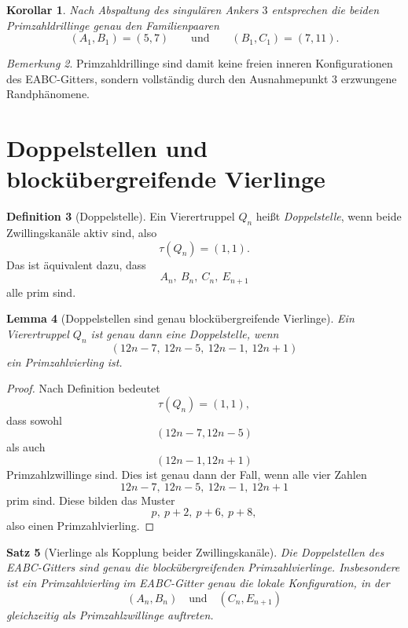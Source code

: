 \documentclass[11pt,a4paper]{article}
\newtheorem{satz}{Satz}
\newtheorem{lemma}[satz]{Lemma}
\newtheorem{korollar}[satz]{Korollar}
\theoremstyle{definition}
\newtheorem{definition}[satz]{Definition}
\theoremstyle{remark}
\newtheorem{bemerkung}[satz]{Bemerkung}
\begin{document}
	\begin{korollar}
		Nach Abspaltung des singulären Ankers \(3\) entsprechen die beiden Primzahldrillinge genau den
		Familienpaaren
		\[
		(A_1,B_1)=(5,7)
		\qquad\text{und}\qquad
		(B_1,C_1)=(7,11).
		\]
	\end{korollar}
	
	\begin{bemerkung}
		Primzahldrillinge sind damit keine freien inneren Konfigurationen des EABC-Gitters, sondern
		vollständig durch den Ausnahmepunkt \(3\) erzwungene Randphänomene.
	\end{bemerkung}
	
	\section{Doppelstellen und blockübergreifende Vierlinge}
	
	\begin{definition}[Doppelstelle]
		Ein Vierertruppel \(Q_n\) heißt \emph{Doppelstelle}, wenn beide Zwillingskanäle aktiv sind, also
		\[
		\tau(Q_n)=(1,1).
		\]
		Das ist äquivalent dazu, dass
		\[
		A_n,\ B_n,\ C_n,\ E_{n+1}
		\]
		alle prim sind.
	\end{definition}
	
	\begin{lemma}[Doppelstellen sind genau blockübergreifende Vierlinge]
		Ein Vierertruppel \(Q_n\) ist genau dann eine Doppelstelle, wenn
		\[
		(12n-7,\ 12n-5,\ 12n-1,\ 12n+1)
		\]
		ein Primzahlvierling ist.
	\end{lemma}
	
	\begin{proof}
		Nach Definition bedeutet
		\[
		\tau(Q_n)=(1,1),
		\]
		dass sowohl
		\[
		(12n-7,12n-5)
		\]
		als auch
		\[
		(12n-1,12n+1)
		\]
		Primzahlzwillinge sind. Dies ist genau dann der Fall, wenn alle vier Zahlen
		\[
		12n-7,\ 12n-5,\ 12n-1,\ 12n+1
		\]
		prim sind. Diese bilden das Muster
		\[
		p,\ p+2,\ p+6,\ p+8,
		\]
		also einen Primzahlvierling.
	\end{proof}
	
	\begin{satz}[Vierlinge als Kopplung beider Zwillingskanäle]
		Die Doppelstellen des EABC-Gitters sind genau die blockübergreifenden Primzahlvierlinge.
		Insbesondere ist ein Primzahlvierling im EABC-Gitter genau die lokale Konfiguration, in der
		\[
		(A_n,B_n)
		\quad\text{und}\quad
		(C_n,E_{n+1})
		\]
		gleichzeitig als Primzahlzwillinge auftreten.
	\end{satz}
	
\end{document}
